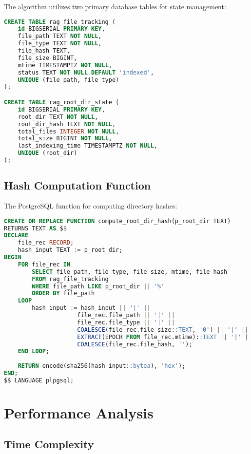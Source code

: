 \documentclass[11pt,a4paper]{article}
\begin{document}
The algorithm utilizes two primary database tables for state management:

\begin{lstlisting}[language=SQL]
CREATE TABLE rag_file_tracking (
    id BIGSERIAL PRIMARY KEY,
    file_path TEXT NOT NULL,
    file_type TEXT NOT NULL,
    file_hash TEXT,
    file_size BIGINT,
    mtime TIMESTAMPTZ NOT NULL,
    status TEXT NOT NULL DEFAULT 'indexed',
    UNIQUE (file_path, file_type)
);

CREATE TABLE rag_root_dir_state (
    id BIGSERIAL PRIMARY KEY,
    root_dir TEXT NOT NULL,
    root_dir_hash TEXT NOT NULL,
    total_files INTEGER NOT NULL,
    total_size BIGINT NOT NULL,
    last_indexing_time TIMESTAMPTZ NOT NULL,
    UNIQUE (root_dir)
);
\end{lstlisting}

\subsection{Hash Computation Function}

The PostgreSQL function for computing directory hashes:

\begin{lstlisting}[language=SQL]
CREATE OR REPLACE FUNCTION compute_root_dir_hash(p_root_dir TEXT)
RETURNS TEXT AS $$
DECLARE
    file_rec RECORD;
    hash_input TEXT := p_root_dir;
BEGIN
    FOR file_rec IN 
        SELECT file_path, file_type, file_size, mtime, file_hash
        FROM rag_file_tracking 
        WHERE file_path LIKE p_root_dir || '%'
        ORDER BY file_path
    LOOP
        hash_input := hash_input || '|' || 
                     file_rec.file_path || '|' ||
                     file_rec.file_type || '|' ||
                     COALESCE(file_rec.file_size::TEXT, '0') || '|' ||
                     EXTRACT(EPOCH FROM file_rec.mtime)::TEXT || '|' ||
                     COALESCE(file_rec.file_hash, '');
    END LOOP;
    
    RETURN encode(sha256(hash_input::bytea), 'hex');
END;
$$ LANGUAGE plpgsql;
\end{lstlisting}

\section{Performance Analysis}

\subsection{Time Complexity}
\end{document}
